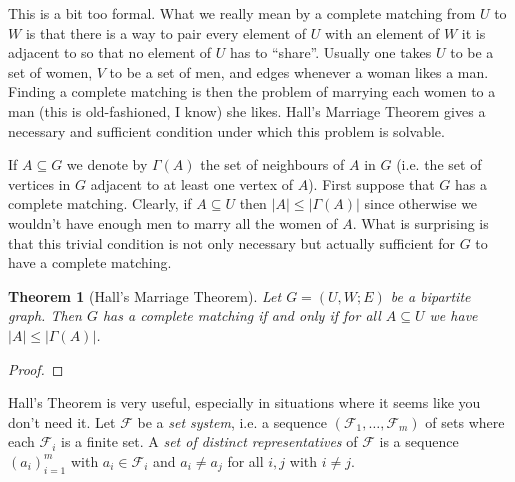 \documentclass{report}
\theoremstyle{definition}
\theoremstyle{plain}
\newtheorem{thm}{Theorem}[section]
\theoremstyle{definition}
\begin{document}
	This is a bit too formal. What we really mean by a complete matching from $U$ to $W$ is that there is a way to pair every element of $U$ with an element of $W$ it is adjacent to so that no element of $U$ has to ``share''. Usually one takes $U$ to be a set of women, $V$ to be a set of men, and edges whenever a woman likes a man. Finding a complete matching is then the problem of marrying each women to a man (this is old-fashioned, I know) she likes. Hall's Marriage Theorem gives a necessary and sufficient condition under which this problem is solvable.
	
	If $A\subseteq G$ we denote by $\Gamma(A)$ the set of neighbours of $A$ in $G$ (i.e. the set of vertices in $G$ adjacent to at least one vertex of $A$). First suppose that $G$ has a complete matching. Clearly, if $A\subseteq U$ then $|A| \leq |\Gamma(A)|$ since otherwise we wouldn't have enough men to marry all the women of $A$. What is surprising is that this trivial condition is not only necessary but actually sufficient for $G$ to have a complete matching.
	\begin{thm}[Hall's Marriage Theorem]
		Let $G = (U,W;E)$ be a bipartite graph. Then $G$ has a complete matching if and only if for all $A\subseteq U$ we have $|A|\leq |\Gamma(A)|$.
	\end{thm}
	\begin{proof}
		\color{red}{TODO}
	\end{proof}
	
	Hall's Theorem is very useful, especially in situations where it seems like you don't need it. Let $\mathcal{F}$ be a \emph{set system}, i.e. a sequence $(\mathcal{F}_1,\ldots,\mathcal{F}_m)$ of sets where each $\mathcal{F}_i$ is a finite set. A \emph{set of distinct representatives} of $\mathcal{F}$ is a sequence $(a_i)_{i=1}^{m}$ with $a_i\in \mathcal{F}_i$ and $a_i \neq a_j$ for all $i,j$ with $i\neq j$. 
	
\end{document}
